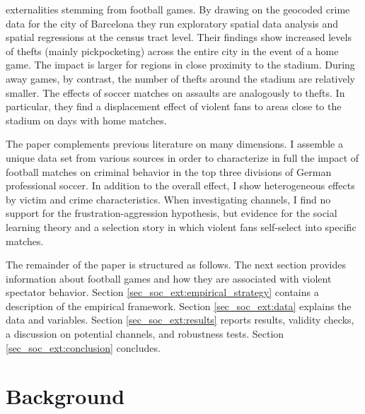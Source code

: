 \documentclass[11pt, a4paper]{article} %
\begin{document}
externalities stemming from football games. By drawing on the geocoded crime data for the city of Barcelona they run exploratory spatial data analysis and spatial regressions at the census tract level. Their findings show increased levels of thefts (mainly pickpocketing) across the entire city in the event of a home game. The impact is larger for regions in close proximity to the stadium. During away games, by contrast, the number of thefts around the stadium are relatively smaller. The effects of soccer matches on assaults are analogously to thefts. In particular, they find a displacement effect of violent fans to areas close to the stadium on days with home matches.


	
	
The paper complements previous literature on many dimensions. I assemble a unique data set from various sources in order to characterize in full the impact of football matches on criminal behavior in the top three divisions of German professional soccer. In addition to the overall effect, I show heterogeneous effects by victim and crime characteristics. When investigating channels, I find no support for the frustration-aggression hypothesis, but evidence for the social learning theory and a selection story in which violent fans self-select into specific matches.





The remainder of the paper is structured as follows. The next section provides information about football games and how they are associated with violent spectator behavior. Section \ref{sec_soc_ext:empirical_strategy} contains a description of the empirical framework. Section \ref{sec_soc_ext:data} explains the data and variables. Section \ref{sec_soc_ext:results} reports results, validity checks, a discussion on potential channels, and robustness tests. Section \ref{sec_soc_ext:conclusion} concludes.






\bigskip
\section{Background}\label{sec_soc_ext:background}
\end{document}
